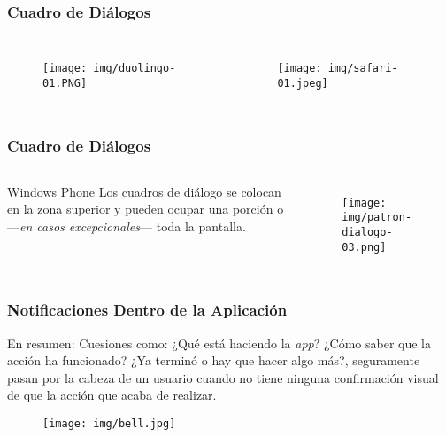 \documentclass{beamer}
\begin{document}
\begin{frame}
\frametitle{Cuadro de Diálogos}

\begin{columns}[c] %

\begin{figure}[H]
  \centering
  \texttt{[image: img/duolingo-01.PNG]}
\end{figure}

\begin{figure}[H]
  \centering
  \texttt{[image: img/safari-01.jpeg]}
\end{figure}

\end{columns}
\end{frame}


\begin{frame}
\frametitle{Cuadro de Diálogos}

\begin{columns}[c] %

\begin{block}{Windows Phone}
\justify
Los cuadros de diálogo se colocan en la zona superior y pueden ocupar una porción o —\textit{en casos excepcionales}— toda la pantalla.
\end{block}

\begin{figure}[H]
  \centering
  \texttt{[image: img/patron-dialogo-03.png]}
\end{figure}
\end{columns}
\end{frame}


\begin{frame}
\frametitle{Notificaciones Dentro de la Aplicación}

\begin{block}{En resumen:}
\justify
Cuesiones como: ¿Qué está haciendo la \textit{app}? ¿Cómo saber que la acción ha funcionado? ¿Ya terminó o hay que hacer algo más?, seguramente pasan por la cabeza de un usuario cuando no tiene ninguna confirmación visual de que la acción que acaba de realizar.
\end{block}

\begin{figure}[H]
  \centering
  \texttt{[image: img/bell.jpg]}
\end{figure}
\end{frame}
\end{document}
